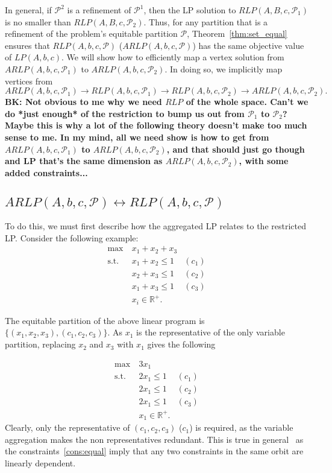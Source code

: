 \documentclass[runningheads]{llncs}
\newcommand{\cP}{{\mathcal P}}
\begin{document}
In general, if $\cP^2$ is a refinement of $\cP^1$, then the LP solution
to $RLP(A,B,c,\cP_1)$ is no smaller than $RLP(A,B,c,\cP_2)$. Thus, for any
partition that is a refinement of the problem's equitable partition $\cP$,
Theorem~\ref{thm:set_equal} ensures that $RLP(A,b,c,\cP)$ ($ARLP(A,b,c,\cP)$) has the same
objective value of $LP(A,b,c)$. We will show how to efficiently map a vertex solution from $ARLP(A,b,c,\cP_1)$ to $ARLP(A,b,c,\cP_2)$. In doing so, we implicitly map vertices from $$ARLP(A,b,c,\cP_1) \rightarrow RLP(A,b,c,\cP_1) \rightarrow RLP(A,b,c,\cP_2) \rightarrow ARLP(A,b,c,\cP_2).$$
{\bf BK: Not obvious to me why we need $RLP$ of the whole space. Can't we do *just enough* of the restriction to bump us out from $\cP_1$ to $\cP_2$? Maybe this is why a lot of the following theory doesn't make too much sense to me. In my mind, all we need show is how to get from $ARLP(A,b,c,\cP_1)$ to $ARLP(A,b,c,\cP_2)$, and that should just go though and LP that's the same dimension as $ARLP(A,b,c,\cP_2)$, with some added constraints...}

\subsection{$ARLP(A,b,c,\cP) \leftrightarrow RLP(A,b,c,\cP) $}
To do this, we must first describe how the aggregated LP relates to the restricted LP. Consider the following example:
\begin{align}
\max\ & x_1 + x_2 + x_3\\
\mbox{s.t. } & x_1 + x_2 \leq 1& (c_1)\\
& x_2 + x_3 \leq 1 & (c_2)\\
& x_1 + x_3 \leq 1 & (c_3)\\
& x_i \in \mathbb{R}^+.
\end{align}

\noindent The equitable partition of the above linear program is $\{(x_1, x_2, x_3), (c_1, c_2, c_3)\}$. As $x_1$ is the representative of the only variable partition, replacing $x_2$ and $x_3$ with $x_1$ gives the following 

\begin{align}
\max\ & 3x_1 \\
\mbox{s.t. } & 2x_1  \leq 1 & (c_1)\\
& 2x_1 \leq 1 & (c_2)\\
& 2x_1  \leq 1 & (c_3)\\
& x_1 \in \mathbb{R}^+.
\end{align}
\noindent Clearly, only the representative of $(c_1, c_2, c_3)$  ($c_1$) is required, as the variable aggregation makes the non representatives redundant. This is true in general~\cite{grohe} as the constraints~\eqref{cons:equal} imply that any two constraints in the same orbit are linearly dependent.
\end{document}
